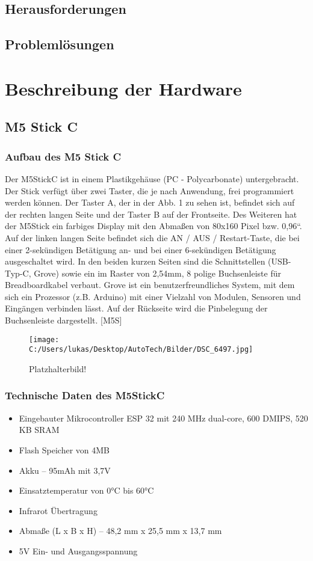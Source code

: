 \documentclass[a4paper,12pt]{article}
\begin{document}
\subsection{Herausforderungen}

\subsection{Problemlösungen}

\section{Beschreibung der Hardware}
\subsection{M5 Stick C}
\subsubsection{Aufbau des M5 Stick C}
Der M5StickC ist in einem Plastikgehäuse (PC - Polycarbonate) untergebracht. Der Stick verfügt über zwei Taster, die je nach Anwendung, frei programmiert werden können. Der Taster A, der in der Abb. 1 zu sehen ist, befindet sich auf der rechten langen Seite und der Taster B auf der Frontseite. Des Weiteren hat der M5Stick ein farbiges Display mit den Abmaßen von 80x160 Pixel bzw. 0,96“. Auf der linken langen Seite befindet sich die AN / AUS / Restart-Taste, die bei einer 2-sekündigen Betätigung an- und bei einer 6-sekündigen Betätigung ausgeschaltet wird. In den beiden kurzen Seiten sind die Schnittstellen (USB-Typ-C, Grove) sowie ein im Raster von 2,54mm, 8 polige Buchsenleiste für Breadboardkabel verbaut. Grove ist ein benutzerfreundliches System, mit dem sich ein Prozessor (z.B. Arduino) mit einer Vielzahl von Modulen, Sensoren und Eingängen verbinden lässt. Auf der Rückseite wird die Pinbelegung der Buchsenleiste dargestellt. [M5S]

\begin{figure}[h]	%
\begin{center}
\texttt{[image: C:/Users/lukas/Desktop/AutoTech/Bilder/DSC\_6497.jpg]}
\caption{Platzhalterbild!}
\label{Golf}
\end{center}
\end{figure}

\subsubsection{Technische Daten des M5StickC}
\begin{itemize}
\item Eingebauter Mikrocontroller ESP 32 mit 240 MHz dual-core, 600 DMIPS, 520 KB SRAM
\item Flash Speicher von 4MB
\item Akku – 95mAh mit 3,7V
\item Einsatztemperatur von 0°C bis 60°C
\item Infrarot Übertragung
\item Abmaße (L x B x H) – 48,2 mm x 25,5 mm x 13,7 mm
\item 5V Ein- und Ausgangsspannung
\end{itemize}
\end{document}
